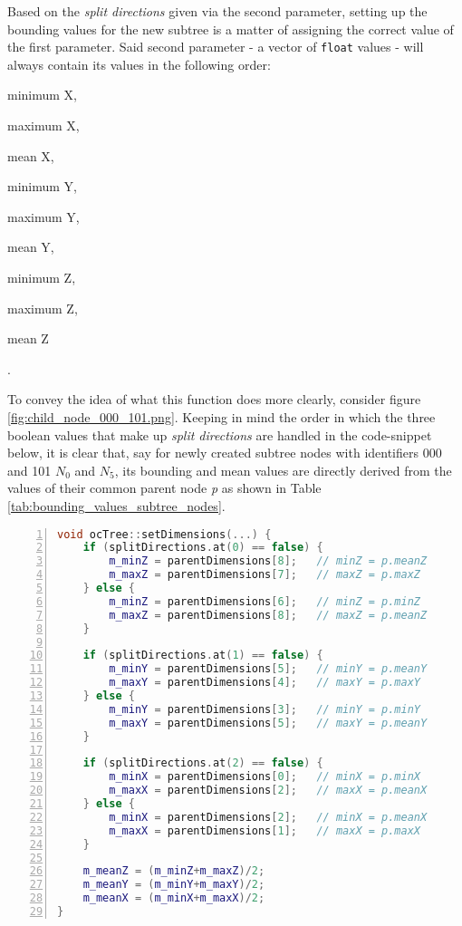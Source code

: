 Based on the \textit{split directions} given via the second parameter, setting up the bounding values for the new subtree is a matter of assigning the correct value of the first parameter. Said second parameter - a vector of \texttt{float} values - will always contain its values in the following order:
\begin{enumerate*}
\addtocounter{enumi}{-1}
	\item minimum X,
	\item maximum X,
	\item mean X,
	\item minimum Y,
	\item maximum Y,
	\item mean Y,
	\item minimum Z,
	\item maximum Z,
	\item mean Z
\end{enumerate*}.

To convey the idea of what this function does more clearly, consider figure \ref{fig:child_node_000_101.png}. Keeping in mind the order in which the three boolean values that make up \textit{split directions} are handled in the code-snippet below, it is clear that, say for newly created subtree nodes with identifiers 000 and 101 \textit{$N_0$} and \textit{$N_5$}, its bounding and mean values are directly derived from the values of their common parent node \textit{p} as shown in Table \ref{tab:bounding_values_subtree_nodes}.

\begin{minipage}{\linewidth}
\begin{lstlisting}[language=C++,numberstyle=\zebra{black!5}{white}{},numbers=left,xleftmargin=2em,tabsize=3]
void ocTree::setDimensions(...) {
	if (splitDirections.at(0) == false) {
		m_minZ = parentDimensions[8];	// minZ = p.meanZ
		m_maxZ = parentDimensions[7];	// maxZ = p.maxZ
	} else {
		m_minZ = parentDimensions[6];	// minZ = p.minZ
		m_maxZ = parentDimensions[8];	// maxZ = p.meanZ
	}

	if (splitDirections.at(1) == false) {
		m_minY = parentDimensions[5];	// minY = p.meanY
		m_maxY = parentDimensions[4];	// maxY = p.maxY
	} else {
		m_minY = parentDimensions[3];	// minY = p.minY
		m_maxY = parentDimensions[5];	// maxY = p.meanY
	}

	if (splitDirections.at(2) == false) {
		m_minX = parentDimensions[0];	// minX = p.minX
		m_maxX = parentDimensions[2];	// maxX = p.meanX
	} else {
		m_minX = parentDimensions[2];	// minX = p.meanX
		m_maxX = parentDimensions[1];	// maxX = p.maxX
	}

	m_meanZ = (m_minZ+m_maxZ)/2;
	m_meanY = (m_minY+m_maxY)/2;
	m_meanX = (m_minX+m_maxX)/2;
}
\end{lstlisting}
\end{minipage}

